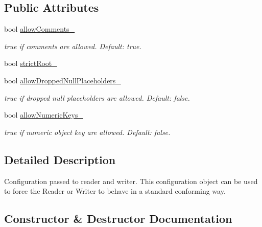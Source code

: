 \subsection*{Public Attributes}
\begin{DoxyCompactItemize}
\item 
bool \hyperlink{classJson_1_1Features_a33afd389719624b6bdb23950b3c346c9_a33afd389719624b6bdb23950b3c346c9}{allow\+Comments\+\_\+}
\begin{DoxyCompactList}\small\item\em {\ttfamily true} if comments are allowed. Default\+: {\ttfamily true}. \end{DoxyCompactList}\item 
bool \hyperlink{classJson_1_1Features_a1162c37a1458adc32582b585b552f9c3_a1162c37a1458adc32582b585b552f9c3}{strict\+Root\+\_\+}
\item 
bool \hyperlink{classJson_1_1Features_a5076aa72c05c7596ac339ede36c97a6a_a5076aa72c05c7596ac339ede36c97a6a}{allow\+Dropped\+Null\+Placeholders\+\_\+}
\begin{DoxyCompactList}\small\item\em {\ttfamily true} if dropped null placeholders are allowed. Default\+: {\ttfamily false}. \end{DoxyCompactList}\item 
bool \hyperlink{classJson_1_1Features_aff3cb16b79d15d3d761b11a0dd6d4d6b_aff3cb16b79d15d3d761b11a0dd6d4d6b}{allow\+Numeric\+Keys\+\_\+}
\begin{DoxyCompactList}\small\item\em {\ttfamily true} if numeric object key are allowed. Default\+: {\ttfamily false}. \end{DoxyCompactList}\end{DoxyCompactItemize}


\subsection{Detailed Description}
Configuration passed to reader and writer. This configuration object can be used to force the Reader or Writer to behave in a standard conforming way. 

\subsection{Constructor \& Destructor Documentation}
\mbox{\label{classJson_1_1Features_ad15a091cb61bb31323299a95970d2644_ad15a091cb61bb31323299a95970d2644}} 
